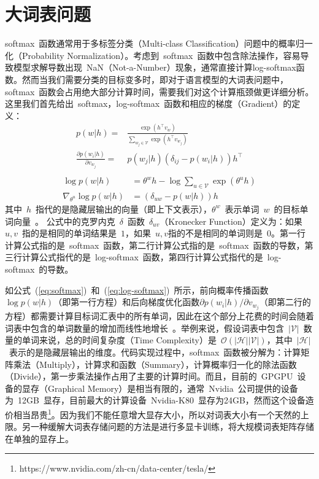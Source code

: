 \section{大词表问题}
softmax~函数通常用于多标签分类（Multi-class Classification）问题中的概率归一化（Probability Normalization）。考虑到~softmax~函数中包含除法操作，容易导致模型求解导数出现~NaN（Not-a-Number）现象，通常直接计算log-softmax函数。然而当我们需要分类的目标变多时，即对于语言模型的大词表问题中，softmax~函数会占用绝大部分计算时间，需要我们对这个计算瓶颈做更详细分析。这里我们首先给出~softmax，log-softmax~函数和相应的梯度（Gradient）的定义：
\begin{equation}\label{eq:softmax}
\begin{split}
p(w|h)=&\frac{\exp(h^\top v_{w})}{\sum_{w_j\in \mathcal{V}}{\exp(h^\top v_{w_j} )}} \\
\frac{\partial p(w_i|h)}{\partial v_{w_j}}=&p(w_j|h)(\delta_{ij}-p(w_i|h))h^\top\\
\end{split}
\end{equation}
\begin{equation}\label{eq:log-softmax}
\begin{split}
\log p(w|h) &= \theta^w h-\log \sum_{u\in \mathcal{V}}{\exp(\theta^u h)}\\
\nabla_{\theta^u}{\log p(w|h)}&= (\delta_{uw}-p(w|h))h
\end{split}
\end{equation}
其中~$h$~指代的是隐藏层输出的向量（即上下文表示），$\theta^w$~表示单词~$w$~的目标单词向量~。
公式中的克罗内克~$\delta$~函数~$\delta_{uv}$（Kronecker Function）定义为：如果~$u,v$~指的是相同的单词结果是~$1$，如果~$u,v$指的不是相同的单词则是~$0$。第一行计算公式指的是~softmax~函数，第二行计算公式指的是~softmax~函数的导数，第三行计算公式指代的是~log-softmax~函数，第四行计算公式指代的是~log-softmax~的导数。


如公式~(\ref{eq:softmax})~和~(\ref{eq:log-softmax})~所示，前向概率传播函数~$\log p(w|h)$（即第一行方程）和后向梯度优化函数${\partial p(w_i|h)}/{\partial v_{w_j}}$（即第二行的方程）都需要计算目标词汇表中的所有单词，因此在这个部分上花费的时间会随着词表中包含的单词数量的增加而线性地增长~。举例来说，假设词表中包含~$\mathcal{|V|}$~数量的单词来说，总的时间复杂度（Time Complexity）是~$\mathcal{O}(\mathcal{|H||V|})$，其中~$\mathcal{|H|}$~表示的是隐藏层输出的维度。代码实现过程中，softmax~函数被分解为：计算矩阵乘法（Multiply），计算求和函数（Summary），计算概率归一化的除法函数（Divide），第一步乘法操作占用了主要的计算时间。而且，目前的~GPGPU~设备的显存（Graphical Memory）是相当有限的，通常~Nvidia~公司提供的设备为~12GB~显存，目前最大的计算设备~Nvidia-K80~显存为24GB，然而这个设备造价相当昂贵\footnote{https://www.nvidia.com/zh-cn/data-center/tesla/}。因为我们不能任意增大显存大小，所以对词表大小有一个天然的上限。另一种缓解大词表存储问题的方法是进行多显卡训练，将大规模词表矩阵存储在单独的显存上。

